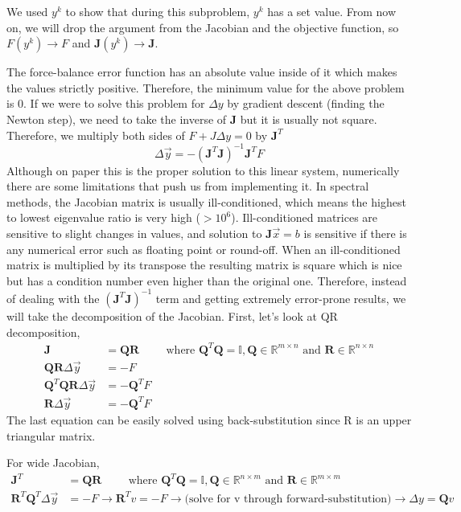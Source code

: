 We used $y^k$ to show that during this subproblem, $y^k$ has a set value. From now on, we will drop the argument from the Jacobian and the objective function, so $F(y^k)\rightarrow F$ and $\mathbf{J}(y^k) \rightarrow \mathbf{J}$. 

The force-balance error function has an absolute value inside of it which makes the values strictly positive. Therefore, the minimum value for the above problem is 0. If we were to solve this problem for $\Delta y$ by gradient descent (finding the Newton step), we need to take the inverse of $\mathbf{J}$ but it is usually not square. Therefore, we multiply both sides of $F + J \Delta y = 0$ by $\mathbf{J}^T$
\begin{equation*}
    \Delta \Vec{y} = -{(\mathbf{J}^T\mathbf{J})}^{-1}\mathbf{J}^TF 
\end{equation*}
Although on paper this is the proper solution to this linear system, numerically there are some limitations that push us from implementing it. In spectral methods, the Jacobian matrix is usually ill-conditioned, which means the highest to lowest eigenvalue ratio is very high ($>10^6$). Ill-conditioned matrices are sensitive to slight changes in values, and solution to $\mathbf{J}\Vec{x}=b$ is sensitive if there is any numerical error such as floating point or round-off. When an ill-conditioned matrix is multiplied by its transpose the resulting matrix is square which is nice but has a condition number even higher than the original one. Therefore, instead of dealing with the ${(\mathbf{J}^T\mathbf{J})}^{-1}$ term and getting extremely error-prone results, we will take the decomposition of the Jacobian. First, let's look at QR decomposition,
\begin{align*}
    \mathbf{J} &= \mathbf{Q}\mathbf{R} \hspace{1cm} \text{where } \mathbf{Q}^T\mathbf{Q}=\mathbb{I}, \mathbf{Q}\in \mathbb{R}^{m\times n} \text{ and }\mathbf{R}\in \mathbb{R}^{n\times n}\\
    \mathbf{Q}\mathbf{R}\Delta \Vec{y} &= - F \\
    \mathbf{Q}^T\mathbf{Q}\mathbf{R}\Delta \Vec{y} &= - \mathbf{Q}^TF \\
    \mathbf{R}\Delta \Vec{y} &= - \mathbf{Q}^TF
\end{align*}
The last equation can be easily solved using back-substitution since R is an upper triangular matrix.

For wide Jacobian,
\begin{align*}
    \mathbf{J}^T &= \mathbf{Q}\mathbf{R} \hspace{1cm} \text{where } \mathbf{Q}^T\mathbf{Q}=\mathbb{I}, \mathbf{Q}\in \mathbb{R}^{n\times m} \text{ and }\mathbf{R}\in \mathbb{R}^{m\times m}\\
    {\mathbf{R}^T}\mathbf{Q}^T\Delta \Vec{y} &= - F \rightarrow {\mathbf{R}^T}v = - F  \rightarrow \text{(solve for v through forward-substitution)} \rightarrow \Delta y = \mathbf{Q}v 
\end{align*}

